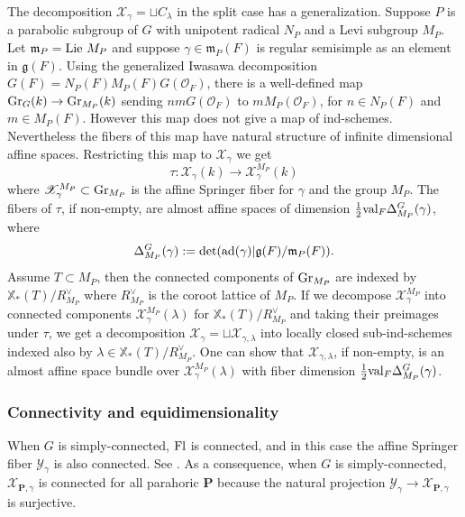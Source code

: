 \documentclass[]{pcmi}
\let\oldsubsubsection\subsubsection
\renewcommand{\subsubsection}[1]{%
\setcounter{subsubsection}{\value{equation}}%
\oldsubsubsection{#1}%
\refstepcounter{equation}%
}
\theoremstyle{plain}
\theoremstyle{definition}
\def\calO{\mathcal{O}}
\newcommand{\sX}{\ensuremath{\mathscr{X}}\xspace}
\newcommand{\sY}{\ensuremath{\mathscr{Y}}\xspace}
\newcommand{\sX}{\ensuremath{\mathcal{X}}\xspace}
\newcommand{\sY}{\ensuremath{\mathcal{Y}}\xspace}
\def\bP{\mathbf{P}}
\newcommand\frg{\mathfrak{g}}
\newcommand{\Fl}{\textup{Fl}}
\newcommand{\Gr}{\textup{Gr}}
\newcommand\Lie{\textup{Lie}\ }
\newcommand{\val}{\textup{val}}
\newcommand{\ad}{\textup{ad}}
\newcommand\xcoch{\mathbb{X}_*}
\renewcommand{\l}{\lambda}
\begin{document}
The decomposition $\sX_{\gamma}=\sqcup C_{\l}$ in the split case has a generalization. Suppose $P$ is a parabolic subgroup of $G$ with unipotent radical $N_{P}$ and a Levi subgroup $M_{P}$.  Let $\mathfrak{m}_{P}=\Lie M_{P}$ and suppose $\gamma\in\mathfrak{m}_{P}(F)$ is regular semisimple as an element in  $\frg(F)$.  Using the generalized Iwasawa decomposition $G(F)=N_{P}(F)M_{P}(F)G(\calO_{F})$, there is a well-defined map $\Gr_{G}(k)\to \Gr_{M_{P}}(k)$ sending $nm G(\calO_{F})$ to $m M_{P}(\calO_{F})$, for $n\in N_{P}(F)$ and $m\in M_{P}(F)$. However this map does not give a map of ind-schemes. Nevertheless the fibers of this map have natural structure of infinite dimensional affine spaces. Restricting this map to $\sX_{\gamma}$ we get
\begin{equation*}
\tau: \sX_{\gamma}(k)\to \sX^{M_{P}}_{\gamma}(k)
\end{equation*}
where $\sX^{M_{P}}_{\gamma}\subset \Gr_{M_{P}}$ is the affine Springer fiber for $\gamma$ and the group $M_{P}$. The fibers of $\tau$, if non-empty, are almost affine spaces of dimension $\frac{1}{2}\val_{F}\Delta^{G}_{M_{P}}(\gamma)$, where
\begin{equation}\label{Delta G L}
\Delta^{G}_{M_{P}}(\gamma):=\det(\ad(\gamma)|\frg(F)/\mathfrak{m}_{P}(F)).
\end{equation}
Assume $T\subset M_{P}$, then the connected components of $\Gr_{M_{P}}$ are indexed by $\xcoch(T)/R^{\vee}_{M_{P}}$ where $R^{\vee}_{M_{P}}$ is the coroot lattice of $M_{P}$. If we decompose $\sX^{M_{P}}_{\gamma}$ into connected components $\sX^{M_{P}}_{\gamma}(\l)$ for $\xcoch(T)/R^{\vee}_{M_{P}}$ and taking their preimages under $\tau$, we get a decomposition $\sX_{\gamma}=\sqcup\sX_{\gamma,\l}$ into locally closed sub-ind-schemes indexed also by $\l\in\xcoch(T)/R^{\vee}_{M_{P}}$. One can show that $\sX_{\gamma,\l}$, if non-empty, is an almost affine space bundle over $\sX^{M_{P}}_{\gamma}(\l)$ with fiber dimension $\frac{1}{2}\val_{F}\Delta^{G}_{M_{P}}(\gamma)$.



\subsubsection{Connectivity and equidimensionality}\label{sss:equidim} When $G$ is simply-connected,  $\Fl$ is connected, and in this case the affine Springer fiber $\sY_{\gamma}$ is also connected. See \cite[\S4, Lemma 2]{KL}. As a consequence, when $G$ is simply-connected,  $\sX_{\bP,\gamma}$ is connected for all parahoric $\bP$ because the natural projection $\sY_{\gamma}\to \sX_{\bP,\gamma}$ is surjective. 
\end{document}
